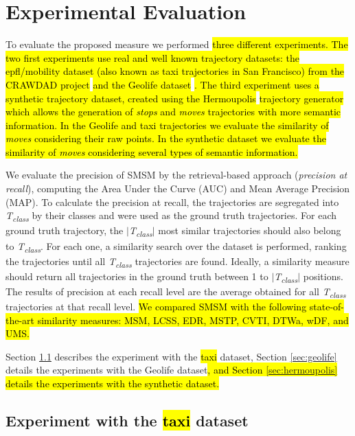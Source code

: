 \documentclass[12pt]{article}
\begin{document}
\section{Experimental Evaluation} \label{sec:experiments}
To evaluate the proposed measure we performed \hl{three different experiments. The two first experiments use real and well known trajectory datasets: the epfl/mobility dataset (also known as taxi trajectories in San Francisco) from the CRAWDAD project }\citep{epfl-mobility-20090224}\hl{ and the Geolife dataset }\citep{zheng2009mining}\hl{. The third experiment uses a synthetic trajectory dataset, created using the Hermoupolis }\citep{Pelekis-Hermoupolis}\hl{ trajectory generator which allows the generation of \emph{stops} and \emph{moves} trajectories with more semantic information. In the Geolife and taxi trajectories we evaluate the similarity of \emph{moves} considering their raw points. In the synthetic dataset we evaluate the similarity of \emph{moves} considering several types of semantic information.}

We evaluate the precision of SMSM by the retrieval-based approach (\textit{precision at recall}), computing the Area Under the Curve (AUC) and Mean Average Precision (MAP). To calculate the precision at recall, the trajectories are segregated into \textit{T\textsubscript{class}} by their classes and were used as the ground truth trajectories. For each ground truth trajectory, the $|$\textit{T\textsubscript{class}}$|$ most similar trajectories should also belong to \textit{T\textsubscript{class}}. For each one, a similarity search over the dataset is performed, ranking the trajectories until all \textit{T\textsubscript{class}} trajectories are found. Ideally, a similarity measure should return all trajectories in the ground truth between 1 to $|$\textit{T\textsubscript{class}}$|$ positions. The results of precision at each recall level are the average obtained for all \textit{T\textsubscript{class}} trajectories at that recall level. \hl{We compared SMSM with the following state-of-the-art similarity measures: MSM, LCSS, EDR, MSTP, CVTI, DTWa, wDF, and UMS.}

Section \ref{sec:new_crawdad} describes the experiment with the \hl{taxi} dataset, Section \ref{sec:geolife} details the experiments with the Geolife dataset\hl{, and Section {\ref{sec:hermoupolis}} details the experiments with the synthetic dataset.}

\subsection{Experiment with the \hl{taxi} dataset}\label{sec:new_crawdad}
\end{document}
